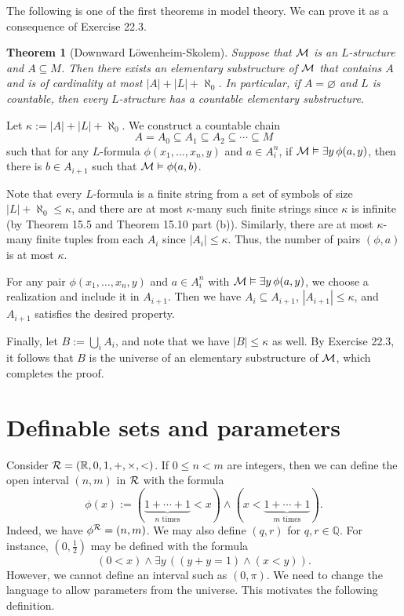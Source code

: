 \documentclass[10pt]{article}
\makeatletter
\newcommand{\R}{\mathbb{R}}
\newcommand{\Q}{\mathbb{Q}}
\theoremstyle{newstyle}
\newtheorem{thm}{Theorem}[section]
\newenvironment{pf}[1][\proofname]{\par
  \pushQED{\qed}%
  \normalfont \topsep0\p@\relax
  \trivlist
  \item[\hskip\labelsep\scshape
  #1\@addpunct{.}]\ignorespaces
}{%
  \popQED\endtrivlist\@endpefalse
}
\makeatother
\begin{document}
The following is one of the first theorems in model theory. We can prove it
as a consequence of Exercise 22.3.

\begin{thm}[Downward L\"owenheim-Skolem]
Suppose that ${\cal M}$ is an $L$-structure and $A \subseteq M$. Then there exists an elementary 
substructure of ${\cal M}$ that contains $A$ and is of cardinality at most $|A| + |L| + \aleph_0$. 
In particular, if $A = \varnothing$ and $L$ is countable, then every $L$-structure has a 
countable elementary substructure.
\end{thm}
\begin{pf}
Let $\kappa := |A| + |L| + \aleph_0$. We construct a countable chain 
\[ A = A_0 \subseteq A_1 \subseteq A_2 \subseteq \cdots \subseteq M \] 
such that for any $L$-formula $\phi(x_1, \dots, x_n, y)$ and $a \in A_i^n$, if 
${\cal M} \vDash \exists y \, \phi(a, y)$, then there is $b \in A_{i+1}$ such that 
${\cal M} \vDash \phi(a, b)$.

Note that every $L$-formula is a finite string from a set of symbols of size $|L| + \aleph_0 
\leq \kappa$, and there are at most $\kappa$-many such finite strings since 
$\kappa$ is infinite (by Theorem 15.5 and Theorem 15.10 part (b)). Similarly, 
there are at most $\kappa$-many finite tuples from each $A_i$ since $|A_i| \leq \kappa$. 
Thus, the number of pairs $(\phi, a)$ is at most $\kappa$. 

For any pair $\phi(x_1, \dots, x_n, y)$ 
and $a \in A_i^n$ with ${\cal M} \vDash \exists y \, \phi(a, y)$, we choose a realization 
and include it in $A_{i+1}$. Then we have $A_i \subseteq A_{i+1}$, $|A_{i+1}| \leq 
\kappa$, and $A_{i+1}$ satisfies the desired property. 

Finally, let $B := \bigcup_i A_i$, and note that we have $|B| \leq \kappa$ as well. By 
Exercise 22.3, it follows that $B$ is the universe of an elementary substructure of 
${\cal M}$, which completes the proof.
\end{pf}

\newpage 
\section{Definable sets and parameters}

Consider ${\cal R} = (\R, 0, 1, +, \times, <)$. If $0 \leq n < m$ are integers, then 
we can define the open interval $(n, m)$ in ${\cal R}$ with the formula 
\[ \phi(x) := (\underbrace{1 + \cdots + 1}_{\text{$n$ times}} < x) 
\wedge (x < \underbrace{1+ \cdots + 1}_{\text{$m$ times}}). \]
Indeed, we have $\phi^{\cal R} = (n, m)$. We may also define $(q, r)$ for $q, r \in \Q$. 
For instance, $(0, \frac12)$ may be defined with the formula
\[ (0 < x) \wedge \exists y \, ((y + y = 1) \wedge (x < y)). \] 
However, we cannot define an interval such as $(0, \pi)$. We need to change the 
language to allow parameters from the universe. This motivates the following definition.
\end{document}
